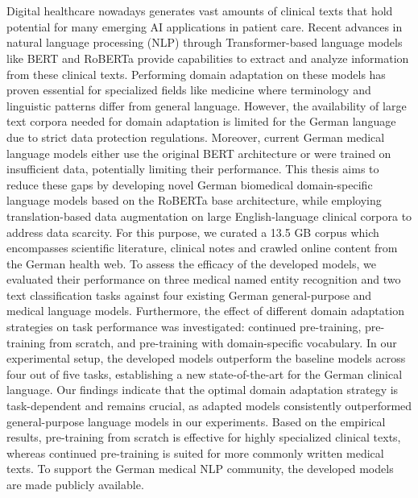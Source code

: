 \chapter{\abstractname}

Digital healthcare nowadays generates vast amounts of clinical texts that hold
potential for many emerging AI applications in patient care. Recent advances in
natural language processing (NLP) through Transformer-based language models like
BERT and RoBERTa provide capabilities to extract and analyze information from
these clinical texts. Performing domain adaptation on these models has proven
essential for specialized fields like medicine where terminology and linguistic
patterns differ from general language. However, the availability of large text
corpora needed for domain adaptation is limited for the German language due to
strict data protection regulations. Moreover, current German medical language
models either use the original BERT architecture or were trained on insufficient
data, potentially limiting their performance. This thesis aims to reduce these
gaps by developing novel German biomedical domain-specific language models based
on the RoBERTa base architecture, while employing translation-based data
augmentation on large English-language clinical corpora to address data
scarcity. For this purpose, we curated a 13.5 GB corpus which encompasses
scientific literature, clinical notes and crawled online content from the German
health web. To assess the efficacy of the developed models, we evaluated their
performance on three medical named entity recognition and two text
classification tasks against four existing German general-purpose and medical
language models. Furthermore, the effect of different domain adaptation
strategies on task performance was investigated: continued pre-training,
pre-training from scratch, and pre-training with domain-specific vocabulary. In
our experimental setup, the developed models outperform the baseline models
across four out of five tasks, establishing a new state-of-the-art for the
German clinical language. Our findings indicate that the optimal domain
adaptation strategy is task-dependent and remains crucial, as adapted models
consistently outperformed general-purpose language models in our experiments.
Based on the empirical results, pre-training from scratch is effective for
highly specialized clinical texts, whereas continued pre-training is suited for
more commonly written medical texts. To support the German medical NLP
community, the developed models are made publicly available.
